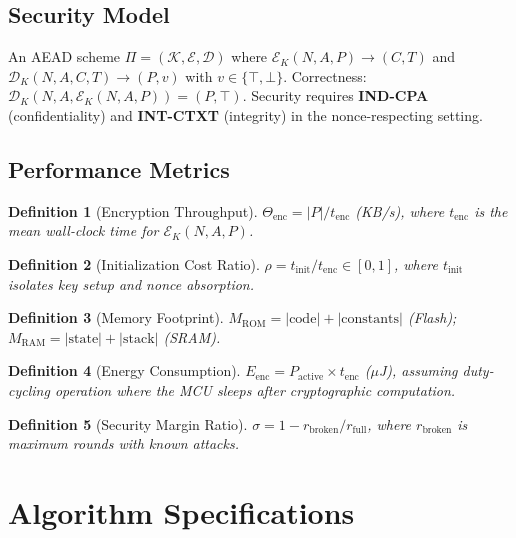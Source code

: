 \documentclass[11pt,a4paper]{article}
\newtheorem{definition}{Definition}[section]
\begin{document}
\subsection{Security Model}

An AEAD scheme $\Pi = (\mathcal{K}, \mathcal{E}, \mathcal{D})$ where $\mathcal{E}_K(N, A, P) \to (C, T)$ and $\mathcal{D}_K(N, A, C, T) \to (P, v)$ with $v \in \{\top, \bot\}$. Correctness: $\mathcal{D}_K(N, A, \mathcal{E}_K(N, A, P)) = (P, \top)$. Security requires \textbf{IND-CPA} (confidentiality) and \textbf{INT-CTXT} (integrity) in the nonce-respecting setting.

\subsection{Performance Metrics}

\begin{definition}[Encryption Throughput]
$\Theta_{\text{enc}} = |P| / t_{\text{enc}}$ (KB/s), where $t_{\text{enc}}$ is the mean wall-clock time for $\mathcal{E}_K(N, A, P)$.
\end{definition}

\begin{definition}[Initialization Cost Ratio]
$\rho = t_{\text{init}} / t_{\text{enc}} \in [0,1]$, where $t_{\text{init}}$ isolates key setup and nonce absorption.
\end{definition}

\begin{definition}[Memory Footprint]
$M_{\text{ROM}} = |\text{code}| + |\text{constants}|$ (Flash); $M_{\text{RAM}} = |\text{state}| + |\text{stack}|$ (SRAM).
\end{definition}

\begin{definition}[Energy Consumption]
$E_{\text{enc}} = P_{\text{active}} \times t_{\text{enc}}$ ($\mu$J), assuming duty-cycling operation where the MCU sleeps after cryptographic computation.
\end{definition}

\begin{definition}[Security Margin Ratio]
$\sigma = 1 - r_{\text{broken}} / r_{\text{full}}$, where $r_{\text{broken}}$ is maximum rounds with known attacks.
\end{definition}

\section{Algorithm Specifications}
\end{document}
